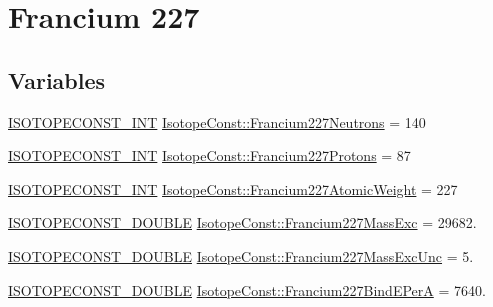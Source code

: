 \hypertarget{group___isotope_const-_francium-_fr227}{}\section{Francium 227}
\label{group___isotope_const-_francium-_fr227}
\subsection*{Variables}
\begin{DoxyCompactItemize}
\item 
\mbox{\hyperlink{group___isotope_const-_macros_ga5f18360b3e99483a35c32d789e62621c}{I\+S\+O\+T\+O\+P\+E\+C\+O\+N\+S\+T\+\_\+\+I\+NT}} \mbox{\hyperlink{group___isotope_const-_francium-_fr227_ga08d38566603242d7dd94626515a2691e}{Isotope\+Const\+::\+Francium227\+Neutrons}} = 140
\item 
\mbox{\hyperlink{group___isotope_const-_macros_ga5f18360b3e99483a35c32d789e62621c}{I\+S\+O\+T\+O\+P\+E\+C\+O\+N\+S\+T\+\_\+\+I\+NT}} \mbox{\hyperlink{group___isotope_const-_francium-_fr227_ga25b5049f55630ae3d2afa50f2b9f6ace}{Isotope\+Const\+::\+Francium227\+Protons}} = 87
\item 
\mbox{\hyperlink{group___isotope_const-_macros_ga5f18360b3e99483a35c32d789e62621c}{I\+S\+O\+T\+O\+P\+E\+C\+O\+N\+S\+T\+\_\+\+I\+NT}} \mbox{\hyperlink{group___isotope_const-_francium-_fr227_ga2adb7ca9c0fc73fb746bb2f740323f15}{Isotope\+Const\+::\+Francium227\+Atomic\+Weight}} = 227
\item 
\mbox{\hyperlink{group___isotope_const-_macros_ga8f45a7272ce02c0b4c65c44636ed719a}{I\+S\+O\+T\+O\+P\+E\+C\+O\+N\+S\+T\+\_\+\+D\+O\+U\+B\+LE}} \mbox{\hyperlink{group___isotope_const-_francium-_fr227_gabf81347553a1acac31189c4c4e3c09f3}{Isotope\+Const\+::\+Francium227\+Mass\+Exc}} = 29682.
\item 
\mbox{\hyperlink{group___isotope_const-_macros_ga8f45a7272ce02c0b4c65c44636ed719a}{I\+S\+O\+T\+O\+P\+E\+C\+O\+N\+S\+T\+\_\+\+D\+O\+U\+B\+LE}} \mbox{\hyperlink{group___isotope_const-_francium-_fr227_gabba21a47119a5371a2f5b4b279d7835c}{Isotope\+Const\+::\+Francium227\+Mass\+Exc\+Unc}} = 5.
\item 
\mbox{\hyperlink{group___isotope_const-_macros_ga8f45a7272ce02c0b4c65c44636ed719a}{I\+S\+O\+T\+O\+P\+E\+C\+O\+N\+S\+T\+\_\+\+D\+O\+U\+B\+LE}} \mbox{\hyperlink{group___isotope_const-_francium-_fr227_ga62e0c72a04dd89cc035fea24e9155c81}{Isotope\+Const\+::\+Francium227\+Bind\+E\+PerA}} = 7640.
\item 

\end{DoxyCompactItemize}
